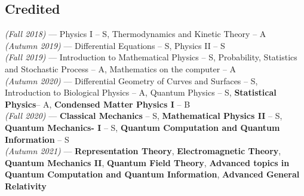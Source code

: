 \documentclass[11pt, a4paper]{article}
\begin{document}
\subsection{\large Credited}
\hspace{0.01\linewidth}
\parbox{0.88\linewidth}{
    {\textit{(Fall 2018)} --- \small Physics I -- S\footnotemark[4], Thermodynamics and Kinetic Theory -- A} \\
    {\textit{(Autumn 2019)} --- \small Differential Equations -- S, Physics II -- S} \\
    {\textit{(Fall 2019)} --- \small Introduction to Mathematical Physics -- S, Probability, Statistics and Stochastic Process -- A, Mathematics on the computer -- A} \\
    {\textit{(Autumn 2020)} --- \small Differential Geometry of Curves and Surfaces -- S, Introduction to Biological Physics -- A, Quantum Physics -- S, \textbf{Statistical Physics}\footnotemark[5] -- A, \textbf{Condensed Matter Physics I} -- B} \\
    {\textit{(Fall 2020)} --- \small \textbf{Classical Mechanics} -- S, \textbf{Mathematical Physics II} -- S, \textbf{Quantum Mechanics- I} -- S, \textbf{Quantum Computation and Quantum Information} -- S} \\
    {\textit{(Autumn 2021)} --- \small \textbf{Representation Theory}, \textbf{Electromagnetic Theory}, \textbf{Quantum Mechanics II}, \textbf{Quantum Field Theory}, \textbf{Advanced topics in Quantum Computation and Quantum Information}, \textbf{Advanced General Relativity}}
}

\end{document}
